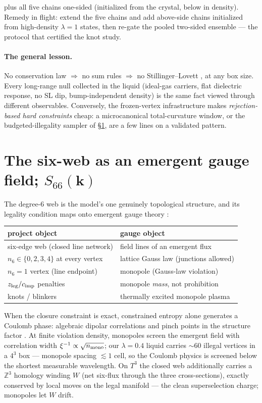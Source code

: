 \documentclass[11pt]{article}
\newcommand{\Nfk}{n_6}
\begin{document}
\noindent plus all five chains one-sided (initialized from the crystal,
below in density). Remedy in flight: extend the five chains and add
above-side chains initialized from high-density $\lambda=1$ states, then
re-gate the pooled two-sided ensemble --- the protocol that certified the
knot study.

\paragraph{The general lesson.} No conservation law $\Rightarrow$ no sum
rules $\Rightarrow$ no Stillinger--Lovett \cite{stillinger-lovett}, at any
box size. Every long-range null collected in the liquid (ideal-gas carriers,
flat dielectric response, no SL dip, bump-independent density) is the same
fact viewed through different observables. Conversely, the frozen-vertex
infrastructure makes \emph{rejection-based hard constraints} cheap: a
microcanonical total-curvature window, or the budgeted-illegality sampler of
\S\ref{sec:s66}, are a few lines on a validated pattern.

\section{The six-web as an emergent gauge field; $S_{66}(\mathbf k)$}
\label{sec:s66}

The degree-6 web is the model's one genuinely topological structure, and its
legality condition maps onto emergent gauge theory
\cite{henley,castelnovo}:

\begin{center}
\begin{tabular}{ll}
\toprule
project object & gauge object \\
\midrule
six-edge web (closed line network) & field lines of an emergent flux \\
$\Nfk \in \{0,2,3,4\}$ at every vertex & lattice Gauss law (junctions allowed) \\
$\Nfk = 1$ vertex (line endpoint) & monopole (Gauss-law violation) \\
$z_{\rm leg}/c_{\rm imp}$ penalties & monopole \emph{mass}, not prohibition \\
knots / blinkers & thermally excited monopole plasma \\
\bottomrule
\end{tabular}
\end{center}

When the closure constraint is exact, constrained entropy alone generates a
Coulomb phase: algebraic dipolar correlations and pinch points in the
structure factor \cite{isakov,henley}. At finite violation density,
monopoles screen the emergent field with correlation width
$\xi^{-1} \propto \sqrt{n_{\rm mono}}$; our $\lambda=0.4$ liquid carries
$\sim 60$ illegal vertices in a $4^3$ box --- monopole spacing
$\lesssim 1$ cell, so the Coulomb physics is screened below the shortest
measurable wavelength. On $T^3$ the closed web additionally carries a
$\mathbb Z^3$ homology winding $W$ (net six-flux through the three
cross-sections), exactly conserved by local moves on the legal manifold ---
the clean superselection charge; monopoles let $W$ drift.
\end{document}

